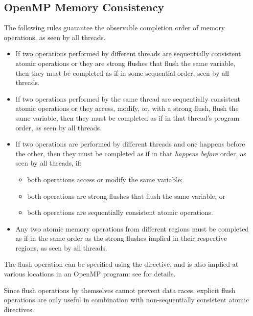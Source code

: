 \subsection{OpenMP Memory Consistency}
\label{subsec:OpenMP Memory Consistency}

The following rules guarantee the observable completion order of memory 
operations, as seen by all threads. 

\begin{itemize}
\item If two operations performed by different threads are sequentially
    consistent atomic operations or they are strong flushes that flush the
    same variable, then they must be completed as if in some sequential order,
    seen by all threads.
\item If two operations performed by the same thread are sequentially
    consistent atomic operations or they access, modify, or, with a strong
    flush, flush the same variable, then they must be completed as if in that
    thread's program order, as seen by all threads.
\item If two operations are performed by different threads and one happens
    before the other, then they must be completed as if in that 
    \emph{happens before} order, as seen by all threads, if:
    \begin{itemize}
        \item both operations access or modify the same variable;
        \item both operations are strong flushes that flush the same variable; or
        \item both operations are sequentially consistent atomic operations.
    \end{itemize}
\item Any two atomic memory operations from different  regions
    must be completed as if in the same order as the strong flushes
    implied in their respective regions, as seen by all threads.
\end{itemize}

The flush operation can be specified using the  directive, 
and is also implied at various locations in an OpenMP program: see 
 for details.

\begin{note}
Since flush operations by themselves cannot prevent data races, explicit 
flush operations are only useful in combination with non-sequentially 
consistent atomic directives.
\end{note}

